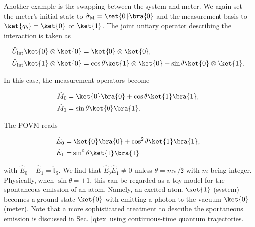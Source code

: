 \documentclass[preprint,pteplogo]{ptephy_v2}%
\numberwithin{equation}{section}
\theoremstyle{definition}
\newcommand{\mr}[1]{\mathrm{#1}}
\newcommand{\mbb}[1]{\mathbb{#1}}
\newcommand{\ketbra}[1]{\ket{#1}\bra{#1}}
\newcommand{\aln}[1]{
\begin{align}
#1
\end{align}
}
\begin{document}
Another example is the swapping between the system and meter.
We again set the meter's initial state to $\hat{\sigma}_\mr{M}=\ket{0}\bra{0}$ and the measurement basis to $\ket{q_b}=\ket{0}$ or $\ket{1}$.
The joint unitary operator describing the interaction is taken as
\aln{
\begin{split}\hat{U}_\mr{int}\ket{0}\otimes \ket{0}&=\ket{0}\otimes \ket{0},\\
\hat{U}_\mr{int}\ket{1}\otimes \ket{0}&=\cos\theta \ket{1}\otimes\ket{0}+\sin\theta  \ket{0}\otimes\ket{1}.
\end{split}}
In this case, the measurement operators become
\aln{
\begin{split}\hat{M}_0&=\ket{0}\bra{0}+\cos\theta\ketbra{1},\\
\hat{M}_1&=\sin\theta\ket{0}\bra{1}.
\end{split}}
The POVM reads
\aln{
\begin{split}\hat{E}_0&=\ket{0}\bra{0}+\cos^2\theta\ketbra{1},\\
\hat{E}_1&=\sin^2\theta\ket{1}\bra{1}
\end{split}}
with $\hat{E}_0+\hat{E}_1=\hat{\mbb{I}}_\mr{S}$.
We find that $\hat{E}_0\hat{E}_1\neq 0$ unless $\theta=m\pi/2$ with $m$ being integer.
Physically, when $\sin\theta=\pm1$, this can be regarded as a toy model for the spontaneous emission of an atom.
Namely, an excited atom $\ket{1}$ (system) becomes a ground state $\ket{0}$ with emitting a photon to the vacuum $\ket{0}$ (meter).
Note that a more sophisticated treatment to describe the spontaneous emission is discussed in Sec. \ref{qtex} using continuous-time quantum trajectories.
\end{document}
